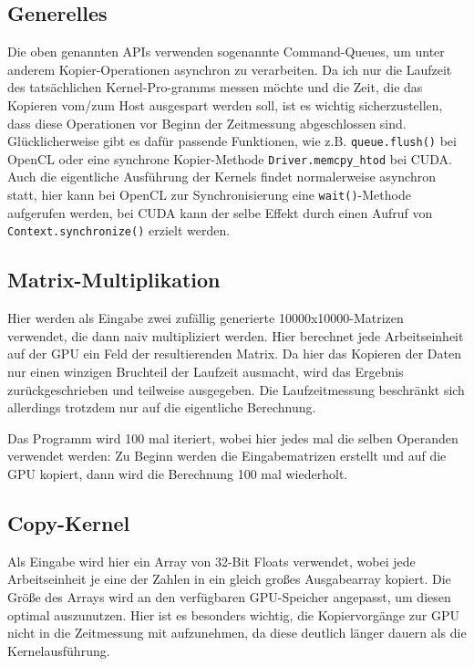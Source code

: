 \documentclass[12pt]{article}
\begin{document}
	\subsection*{Generelles}
	Die oben genannten APIs verwenden sogenannte Command-Queues, um unter anderem Kopier-Operationen asynchron zu verarbeiten.
	Da ich nur die Laufzeit des tatsächlichen Kernel-Pro-gramms messen möchte und die Zeit, die das Kopieren vom/zum Host ausgespart werden soll, ist es wichtig sicherzustellen, dass diese Operationen vor Beginn der Zeitmessung abgeschlossen sind.
	Glücklicherweise gibt es dafür passende Funktionen, wie z.B. \texttt{queue.flush()} bei OpenCL oder eine synchrone Kopier-Methode \texttt{Driver.memcpy\_htod} bei CUDA.
	Auch die eigentliche Ausführung der Kernels findet normalerweise asynchron statt, hier kann bei OpenCL zur Synchronisierung eine \texttt{wait()}-Methode aufgerufen werden, bei CUDA kann der selbe Effekt durch einen Aufruf von \texttt{Context.synchronize()} erzielt werden.
	
	\subsection*{Matrix-Multiplikation}
	Hier werden als Eingabe zwei zufällig generierte 10000x10000-Matrizen verwendet, die dann naiv multipliziert werden. Hier berechnet jede Arbeitseinheit auf der GPU ein Feld der resultierenden Matrix.
	Da hier das Kopieren der Daten nur einen winzigen Bruchteil der Laufzeit ausmacht, wird das Ergebnis zurückgeschrieben und teilweise ausgegeben.
	Die Laufzeitmessung beschränkt sich allerdings trotzdem nur auf die eigentliche Berechnung.
	
	Das Programm wird 100 mal iteriert, wobei hier jedes mal die selben Operanden verwendet werden: Zu Beginn werden die Eingabematrizen erstellt und auf die GPU kopiert, dann wird die Berechnung 100 mal wiederholt.
	
	\subsection*{Copy-Kernel}
	Als Eingabe wird hier ein Array von 32-Bit Floats verwendet, wobei jede Arbeitseinheit je eine der Zahlen in ein gleich großes Ausgabearray kopiert.
	Die Größe des Arrays wird an den verfügbaren GPU-Speicher angepasst, um diesen optimal auszunutzen.
	Hier ist es besonders wichtig, die Kopiervorgänge zur GPU nicht in die Zeitmessung mit aufzunehmen, da diese deutlich länger dauern als die Kernelausführung.
	
\end{document}
